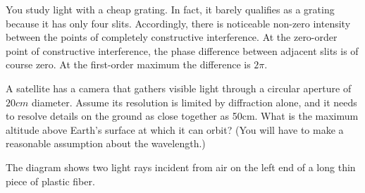 \documentclass{exam}
\begin{document}
\begin{questions}

\question [30] You study light with a cheap grating. In fact, it barely qualifies as a grating because it has only four slits. Accordingly, there is noticeable non-zero intensity between the points of completely constructive interference. At the zero-order point of constructive interference, the phase difference between adjacent slits is of course zero. At the first-order maximum the difference is $2\pi$.

\clearpage


\question [15] A satellite has a camera that gathers visible light through a circular aperture of $20cm$ diameter. Assume its resolution is limited by diffraction alone, and it needs to resolve details on the ground as close together as 50cm. What is the maximum altitude above Earth's surface at which it can orbit? (You will have to make a reasonable assumption about the wavelength.)
\clearpage

\question [20] The diagram shows two light rays incident from air on the left end of a long thin piece of plastic fiber.


\end{questions}
\end{document}
